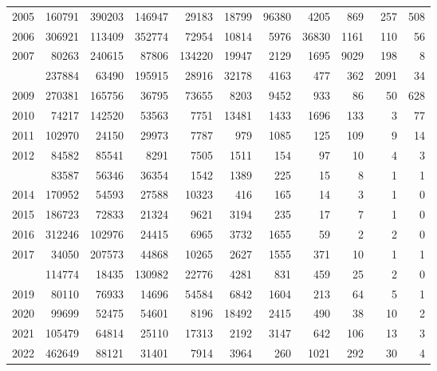 \documentclass[
]{article}
\begin{document}
\begin{longtable}[t]{lrrrrrrrrrr}
2005 & 160791 & 390203 & 146947 & 29183 & 18799 & 96380 & 4205 & 869 & 257 & 508\\
2006 & 306921 & 113409 & 352774 & 72954 & 10814 & 5976 & 36830 & 1161 & 110 & 56\\
2007 & 80263 & 240615 & 87806 & 134220 & 19947 & 2129 & 1695 & 9029 & 198 & 8\\
\addlinespace
2008 & 237884 & 63490 & 195915 & 28916 & 32178 & 4163 & 477 & 362 & 2091 & 34\\
2009 & 270381 & 165756 & 36795 & 73655 & 8203 & 9452 & 933 & 86 & 50 & 628\\
2010 & 74217 & 142520 & 53563 & 7751 & 13481 & 1433 & 1696 & 133 & 3 & 77\\
2011 & 102970 & 24150 & 29973 & 7787 & 979 & 1085 & 125 & 109 & 9 & 14\\
2012 & 84582 & 85541 & 8291 & 7505 & 1511 & 154 & 97 & 10 & 4 & 3\\
\addlinespace
2013 & 83587 & 56346 & 36354 & 1542 & 1389 & 225 & 15 & 8 & 1 & 1\\
2014 & 170952 & 54593 & 27588 & 10323 & 416 & 165 & 14 & 3 & 1 & 0\\
2015 & 186723 & 72833 & 21324 & 9621 & 3194 & 235 & 17 & 7 & 1 & 0\\
2016 & 312246 & 102976 & 24415 & 6965 & 3732 & 1655 & 59 & 2 & 2 & 0\\
2017 & 34050 & 207573 & 44868 & 10265 & 2627 & 1555 & 371 & 10 & 1 & 1\\
\addlinespace
2018 & 114774 & 18435 & 130982 & 22776 & 4281 & 831 & 459 & 25 & 2 & 0\\
2019 & 80110 & 76933 & 14696 & 54584 & 6842 & 1604 & 213 & 64 & 5 & 1\\
2020 & 99699 & 52475 & 54601 & 8196 & 18492 & 2415 & 490 & 38 & 10 & 2\\
2021 & 105479 & 64814 & 25110 & 17313 & 2192 & 3147 & 642 & 106 & 13 & 3\\
2022 & 462649 & 88121 & 31401 & 7914 & 3964 & 260 & 1021 & 292 & 30 & 4\\*
\end{longtable}
\end{document}
